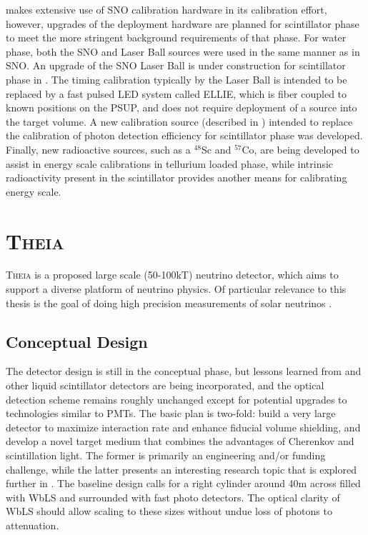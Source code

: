 {\snop} makes extensive use of SNO calibration hardware in its calibration effort, however, upgrades of the deployment hardware are planned for scintillator phase to meet the more stringent background requirements of that phase.
For water phase, both the SNO \N and Laser Ball sources were used in the same manner as in SNO.
An upgrade of the SNO Laser Ball is under construction for scintillator phase in {\snop}.
The timing calibration typically by the Laser Ball is intended to be replaced by a fast pulsed LED system called ELLIE, which is fiber coupled to known positions on the PSUP, and does not require deployment of a source into the target volume.
A new calibration source (described in ) intended to replace the \N calibration of photon detection efficiency for scintillator phase was developed.
Finally, new radioactive sources, such as a $^{48}$Sc and $^{57}$Co, are being developed to assist in energy scale calibrations in tellurium loaded phase, while intrinsic radioactivity present in the scintillator provides another means for calibrating energy scale.

\section{\textsc{Theia}}

\textsc{Theia} \cite{asdc_paper} is a proposed large scale (50-100kT) neutrino detector, which aims to support a diverse platform of neutrino physics. 
Of particular relevance to this thesis is the goal of doing high precision measurements of solar neutrinos \cite{theia_solar}.

\subsection{Conceptual Design}
The detector design is still in the conceptual phase, but lessons learned from {\snop} and other liquid scintillator detectors are being incorporated, and the optical detection scheme remains roughly unchanged except for potential upgrades to technologies similar to PMTs.
The basic plan is two-fold: build a very large detector to maximize interaction rate and enhance fiducial volume shielding, and develop a novel target medium that combines the advantages of Cherenkov and scintillation light.
The former is primarily an engineering and/or funding challenge, while the latter presents an interesting research topic that is explored further in .
The baseline design calls for a right cylinder around 40m across filled with WbLS and surrounded with fast photo detectors.
The optical clarity of WbLS should allow scaling to these sizes without undue loss of photons to attenuation.


